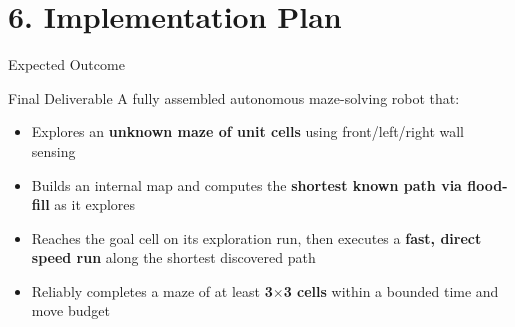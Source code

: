 \documentclass[aspectratio=169,11pt]{beamer}
\newcommand{\highlight}[1]{\textcolor{teal!80!black}{\textbf{#1}}}
\begin{document}
\section{6. Implementation Plan}

\begin{frame}{Expected Outcome}
    \begin{block}{Final Deliverable}
        A fully assembled autonomous maze-solving robot that:
        \begin{itemize}
            \item Explores an \highlight{unknown maze of unit cells} using front/left/right wall sensing
            \item Builds an internal map and computes the \highlight{shortest known path via flood-fill} as it explores
            \item Reaches the goal cell on its exploration run, then executes a \highlight{fast, direct speed run} along the shortest discovered path
            \item Reliably completes a maze of at least \highlight{3$\times$3 cells} within a bounded time and move budget
        \end{itemize}
    \end{block}
\end{frame}
\end{document}
